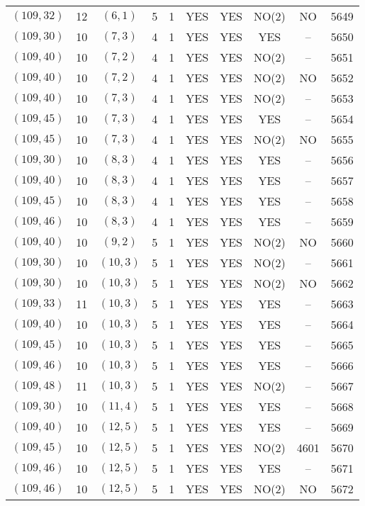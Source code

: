 \begin{longtable}{|c|c|c|c|c|c|c|c|c|c|}
$(109, 32)$ & 12 & $(6, 1)$ & 5 & 1 & YES & YES & NO(2) & NO & 5649\\
$(109, 30)$ & 10 & $(7, 3)$ & 4 & 1 & YES & YES & YES & -- & 5650\\
$(109, 40)$ & 10 & $(7, 2)$ & 4 & 1 & YES & YES & NO(2) & -- & 5651\\
$(109, 40)$ & 10 & $(7, 2)$ & 4 & 1 & YES & YES & NO(2) & NO & 5652\\
$(109, 40)$ & 10 & $(7, 3)$ & 4 & 1 & YES & YES & NO(2) & -- & 5653\\
$(109, 45)$ & 10 & $(7, 3)$ & 4 & 1 & YES & YES & YES & -- & 5654\\
$(109, 45)$ & 10 & $(7, 3)$ & 4 & 1 & YES & YES & NO(2) & NO & 5655\\
$(109, 30)$ & 10 & $(8, 3)$ & 4 & 1 & YES & YES & YES & -- & 5656\\
$(109, 40)$ & 10 & $(8, 3)$ & 4 & 1 & YES & YES & YES & -- & 5657\\
$(109, 45)$ & 10 & $(8, 3)$ & 4 & 1 & YES & YES & YES & -- & 5658\\
$(109, 46)$ & 10 & $(8, 3)$ & 4 & 1 & YES & YES & YES & -- & 5659\\
$(109, 40)$ & 10 & $(9, 2)$ & 5 & 1 & YES & YES & NO(2) & NO & 5660\\
$(109, 30)$ & 10 & $(10, 3)$ & 5 & 1 & YES & YES & NO(2) & -- & 5661\\
$(109, 30)$ & 10 & $(10, 3)$ & 5 & 1 & YES & YES & NO(2) & NO & 5662\\
$(109, 33)$ & 11 & $(10, 3)$ & 5 & 1 & YES & YES & YES & -- & 5663\\
$(109, 40)$ & 10 & $(10, 3)$ & 5 & 1 & YES & YES & YES & -- & 5664\\
$(109, 45)$ & 10 & $(10, 3)$ & 5 & 1 & YES & YES & YES & -- & 5665\\
$(109, 46)$ & 10 & $(10, 3)$ & 5 & 1 & YES & YES & YES & -- & 5666\\
$(109, 48)$ & 11 & $(10, 3)$ & 5 & 1 & YES & YES & NO(2) & -- & 5667\\
$(109, 30)$ & 10 & $(11, 4)$ & 5 & 1 & YES & YES & YES & -- & 5668\\
$(109, 40)$ & 10 & $(12, 5)$ & 5 & 1 & YES & YES & YES & -- & 5669\\
$(109, 45)$ & 10 & $(12, 5)$ & 5 & 1 & YES & YES & NO(2) & 4601 & 5670\\
$(109, 46)$ & 10 & $(12, 5)$ & 5 & 1 & YES & YES & YES & -- & 5671\\
$(109, 46)$ & 10 & $(12, 5)$ & 5 & 1 & YES & YES & NO(2) & NO & 5672\\

\end{longtable}
